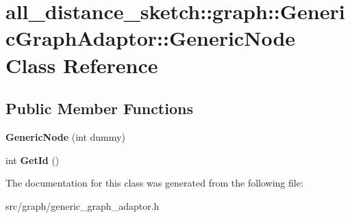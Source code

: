 \hypertarget{classall__distance__sketch_1_1graph_1_1GenericGraphAdaptor_1_1GenericNode}{}\section{all\+\_\+distance\+\_\+sketch\+:\+:graph\+:\+:Generic\+Graph\+Adaptor\+:\+:Generic\+Node Class Reference}
\label{classall__distance__sketch_1_1graph_1_1GenericGraphAdaptor_1_1GenericNode}
\subsection*{Public Member Functions}
\begin{DoxyCompactItemize}
\item 
\hypertarget{classall__distance__sketch_1_1graph_1_1GenericGraphAdaptor_1_1GenericNode_a2702e30b8835ddbfdd768512bba44981}{}{\bfseries Generic\+Node} (int dummy)\label{classall__distance__sketch_1_1graph_1_1GenericGraphAdaptor_1_1GenericNode_a2702e30b8835ddbfdd768512bba44981}

\item 
\hypertarget{classall__distance__sketch_1_1graph_1_1GenericGraphAdaptor_1_1GenericNode_a048bff779b8adbb0679fae364b818c4e}{}int {\bfseries Get\+Id} ()\label{classall__distance__sketch_1_1graph_1_1GenericGraphAdaptor_1_1GenericNode_a048bff779b8adbb0679fae364b818c4e}

\end{DoxyCompactItemize}


The documentation for this class was generated from the following file\+:\begin{DoxyCompactItemize}
\item 
src/graph/generic\+\_\+graph\+\_\+adaptor.\+h\end{DoxyCompactItemize}
